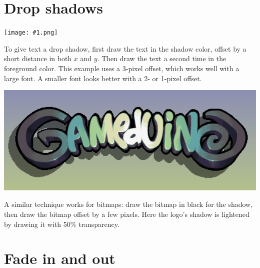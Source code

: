 \documentclass[10pt]{book}
\newcommand{\png}[1]{
\begin{center}
\texttt{[image: \#1.png]}
\end{center}
}
\begin{document}
\newpage
\section{Drop shadows}
\png{0025}
To give text a drop shadow,
first draw the text in the shadow color, offset by a short distance in both $x$ and $y$.
Then draw the text a second time in the foreground color.
This example uses a 3-pixel offset, which works well with a large font.
A smaller font looks better with a 2- or 1-pixel offset.

\noindent
\begin{minipage}[][][t]{0.45\textwidth}
\includegraphics[width=1.0\textwidth]{logodrop.png}
\end{minipage}
\begin{minipage}[][][t]{0.55\textwidth}
A similar technique works for bitmaps: draw the bitmap in black for the shadow, then draw the bitmap
offset by a few pixels.
Here the logo's shadow is lightened by drawing it with 50\% transparency.
\end{minipage}

\newpage
\section{Fade in and out}
\end{document}
